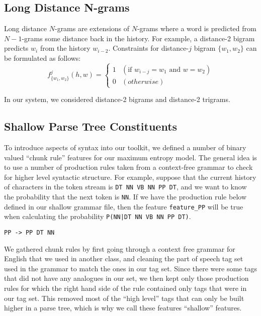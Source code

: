 \documentclass[11pt]{article}
\begin{document}
\subsection{Long Distance N-grams}
\label{sec:longdistance}

Long distance $N$-grams are extensions of $N$-grams where a word is predicted from $N-1$-grams some distance back in the history.
For example, a distance-2 bigram predicts $w_i$ from the history $w_{i-2}$.
Constraints for distance-$j$ bigram $\{w_1, w_2\}$ can be formulated as follows:
\[
  f_{\{w_1, w_2\}}^{j}(h, w) = \begin{cases}
    1 & (\textrm{if } w_{i-j} = w_1 \textrm{ and } w = w_2) \\
    0 & (otherwise)
  \end{cases}
\]

\noindent
In our system, we considered distance-2 bigrams and distance-2 trigrams.

\subsection{Shallow Parse Tree Constituents}
\label{sec:constituent}

To introduce aspects of syntax into our toolkit, we defined a number of
binary valued ``chunk rule'' features for our maximum entropy model. The
general idea is to use a number of production rules taken from a
context-free grammar to check for higher level syntactic structure. For
example, suppose that the current history of characters in the token
stream is \texttt{DT NN VB NN PP DT}, and we want to know the
probability that the next token is \texttt{NN}. If we have the 
production rule below defined in our shallow grammar file, then the
feature \texttt{feature\_PP} will be true when calculating the
probability \texttt{P(NN|DT NN VB NN PP DT)}.

\begin{verbatim}
PP -> PP DT NN
\end{verbatim}

We gathered chunk rules by first going through a context free grammar
for English that we used in another class, and cleaning the part of
speech tag set used in the grammar to match the ones in our tag set.
Since there were some tags that did not have any analogues in our set,
we then kept only those production rules for which the right hand side
of the rule contained only tags that were in our tag set. This removed
most of the ``high level'' tags that can only be built higher in a parse
tree, which is why we call these features ``shallow'' features.
\end{document}
